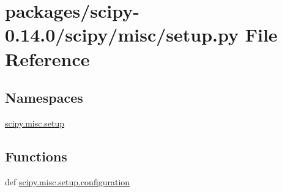\hypertarget{packages_2scipy-0_814_80_2scipy_2misc_2setup_8py}{}\section{packages/scipy-\/0.14.0/scipy/misc/setup.py File Reference}
\label{packages_2scipy-0_814_80_2scipy_2misc_2setup_8py}
\subsection*{Namespaces}
\begin{DoxyCompactItemize}
\item 
 \hyperlink{namespacescipy_1_1misc_1_1setup}{scipy.\+misc.\+setup}
\end{DoxyCompactItemize}
\subsection*{Functions}
\begin{DoxyCompactItemize}
\item 
def \hyperlink{namespacescipy_1_1misc_1_1setup_a3ea45474e5db064958d8e6a94ce641e1}{scipy.\+misc.\+setup.\+configuration}
\end{DoxyCompactItemize}
